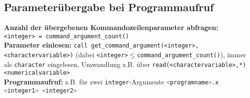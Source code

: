 \documentclass[a4paper, twocolumn]{scrarticle}
\begin{document}
\subsection{Parameterübergabe bei Programmaufruf}
\textbf{Anzahl der übergebenen Kommandozeilenparameter abfragen:} \lstinline|<integer> = command_argument_count()|\\
\textbf{Parameter einlesen:} \lstinline|call get_command_argument(<integer>, <charactervariable>)| (dabei \lstinline|<integer>|$\leq$\lstinline|command_argument_count()|), immer als \lstinline|character| eingelesen, Umwandlung z.B. über \lstinline|read(<charactervariable>,*) <numericalvariable>|\\
\textbf{Programmaufruf:} z.B. für zwei \lstinline|integer|-Argumente \lstinline[language=bash]|<programname>.x <integer1> <integer2>|
\end{document}
